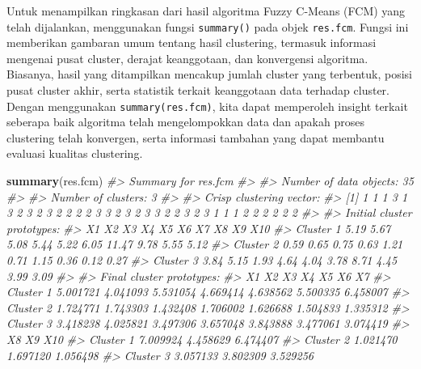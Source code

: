 \documentclass[
  oneside]{book}
\newenvironment{Shaded}{\begin{snugshade}}{\end{snugshade}}
\newcommand{\CommentTok}[1]{\textcolor[rgb]{0.56,0.35,0.01}{\textit{#1}}}
\newcommand{\FunctionTok}[1]{\textcolor[rgb]{0.13,0.29,0.53}{\textbf{#1}}}
\newcommand{\NormalTok}[1]{#1}
\begin{document}
Untuk menampilkan ringkasan dari hasil algoritma Fuzzy C-Means (FCM) yang telah dijalankan, menggunakan fungsi \texttt{summary()} pada objek \texttt{res.fcm}. Fungsi ini memberikan gambaran umum tentang hasil clustering, termasuk informasi mengenai pusat cluster, derajat keanggotaan, dan konvergensi algoritma. Biasanya, hasil yang ditampilkan mencakup jumlah cluster yang terbentuk, posisi pusat cluster akhir, serta statistik terkait keanggotaan data terhadap cluster. Dengan menggunakan \texttt{summary(res.fcm)}, kita dapat memperoleh insight terkait seberapa baik algoritma telah mengelompokkan data dan apakah proses clustering telah konvergen, serta informasi tambahan yang dapat membantu evaluasi kualitas clustering.

\begin{Shaded}
\begin{Highlighting}[]
\FunctionTok{summary}\NormalTok{(res.fcm)}
\CommentTok{\#\textgreater{} Summary for \textquotesingle{}res.fcm\textquotesingle{}}
\CommentTok{\#\textgreater{} }
\CommentTok{\#\textgreater{} Number of data objects:  35 }
\CommentTok{\#\textgreater{} }
\CommentTok{\#\textgreater{} Number of clusters:  3 }
\CommentTok{\#\textgreater{} }
\CommentTok{\#\textgreater{} Crisp clustering vector:}
\CommentTok{\#\textgreater{}  [1] 1 1 1 3 1 3 2 3 2 3 2 2 2 2 3 3 2 3 2 3 3 2 2 3 2 3 1 1 1 2 2 2 2 2 2}
\CommentTok{\#\textgreater{} }
\CommentTok{\#\textgreater{} Initial cluster prototypes:}
\CommentTok{\#\textgreater{}             X1   X2   X3   X4   X5   X6    X7   X8   X9  X10}
\CommentTok{\#\textgreater{} Cluster 1 5.19 5.67 5.08 5.44 5.22 6.05 11.47 9.78 5.55 5.12}
\CommentTok{\#\textgreater{} Cluster 2 0.59 0.65 0.75 0.63 1.21 0.71  1.15 0.36 0.12 0.27}
\CommentTok{\#\textgreater{} Cluster 3 3.84 5.15 1.93 4.64 4.04 3.78  8.71 4.45 3.99 3.09}
\CommentTok{\#\textgreater{} }
\CommentTok{\#\textgreater{} Final cluster prototypes:}
\CommentTok{\#\textgreater{}                 X1       X2       X3       X4       X5       X6       X7}
\CommentTok{\#\textgreater{} Cluster 1 5.001721 4.041093 5.531054 4.669414 4.638562 5.500335 6.458007}
\CommentTok{\#\textgreater{} Cluster 2 1.724771 1.743303 1.432408 1.706002 1.626688 1.504833 1.335312}
\CommentTok{\#\textgreater{} Cluster 3 3.418238 4.025821 3.497306 3.657048 3.843888 3.477061 3.074419}
\CommentTok{\#\textgreater{}                 X8       X9      X10}
\CommentTok{\#\textgreater{} Cluster 1 7.009924 4.458629 6.474407}
\CommentTok{\#\textgreater{} Cluster 2 1.021470 1.697120 1.056498}
\CommentTok{\#\textgreater{} Cluster 3 3.057133 3.802309 3.529256}

\end{Highlighting}
\end{Shaded}
\end{document}
